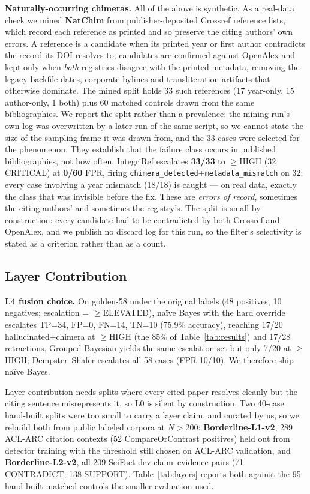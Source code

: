 \documentclass[runningheads]{llncs}
\begin{document}
\noindent\textbf{Naturally-occurring chimeras.} All of the above is synthetic. As a real-data check we mined \textbf{NatChim} from publisher-deposited Crossref reference lists, which record each reference as printed and so preserve the citing authors' own errors. A reference is a candidate when its printed year or first author contradicts the record its DOI resolves to; candidates are confirmed against OpenAlex and kept only when \emph{both} registries disagree with the printed metadata, removing the legacy-backfile dates, corporate bylines and transliteration artifacts that otherwise dominate. The mined split holds 33 such references (17 year-only, 15 author-only, 1 both) plus 60 matched controls drawn from the same bibliographies. We report the split rather than a prevalence: the mining run's own log was overwritten by a later run of the same script, so we cannot state the size of the sampling frame it was drawn from, and the 33 cases were selected for the phenomenon. They establish that the failure class occurs in published bibliographies, not how often. IntegriRef escalates \textbf{33/33} to $\geq$HIGH (32 CRITICAL) at \textbf{0/60} FPR, firing \texttt{chimera\_\allowbreak detected}+\texttt{metadata\_\allowbreak mismatch} on 32; every case involving a year mismatch (18/18) is caught --- on real data, exactly the class that was invisible before the fix. These are \emph{errors of record}, sometimes the citing authors' and sometimes the registry's. The split is small by construction: every candidate had to be contradicted by both Crossref and OpenAlex, and we publish no discard log for this run, so the filter's selectivity is stated as a criterion rather than as a count.


\subsection{Layer Contribution}
\label{ssec:layers}

\noindent\textbf{L4 fusion choice.} On golden-58 under the original labels (48 positives, 10 negatives; escalation = $\geq$ELEVATED), na\"ive Bayes with the hard override escalates TP=34, FP=0, FN=14, TN=10 (75.9\% accuracy), reaching 17/20 hallucinated+chimera at $\geq$HIGH (the 85\% of Table~\ref{tab:results}) and 17/28 retractions. Grouped Bayesian yields the same escalation set but only 7/20 at $\geq$HIGH; Dempster--Shafer escalates all 58 cases (FPR 10/10). We therefore ship na\"ive Bayes.

Layer contribution needs splits where every cited paper resolves cleanly but the citing sentence misrepresents it, so L0 is silent by construction. Two 40-case hand-built splits were too small to carry a layer claim, and curated by us, so we rebuild both from public labeled corpora at $N{>}200$: \textbf{Borderline-L1-v2}, 289 ACL-ARC citation contexts \cite{jurgens2018measuring} (52 CompareOrContrast positives) held out from detector training with the threshold still chosen on ACL-ARC validation, and \textbf{Borderline-L2-v2}, all 209 SciFact dev claim--evidence pairs (71 CONTRADICT, 138 SUPPORT). Table~\ref{tab:layers} reports both against the 95 hand-built matched controls the smaller evaluation used.
\end{document}
